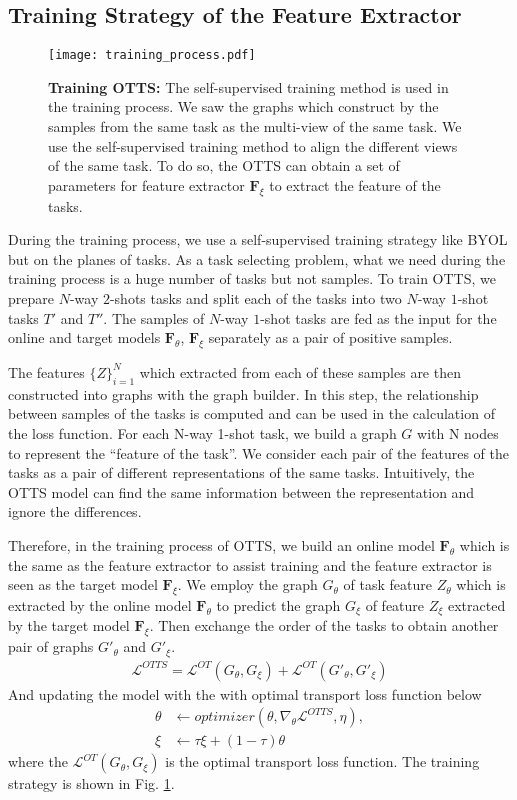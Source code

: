 \documentclass[10pt,journal,compsoc]{IEEEtran}
\begin{document}
\subsection{Training Strategy of the Feature Extractor}

\begin{figure*}[t]
    \centering
    \texttt{[image: training\_process.pdf]}
    \caption{\textbf{Training OTTS:} The self-supervised training method is used in the training process. We saw the graphs which construct by the samples from the same task as the multi-view of the same task. We use the self-supervised training method to align the different views of the same task. To do so, the OTTS can obtain a set of parameters for feature extractor $\mathbf{F}_\xi$ to extract the feature of the tasks.}
    \label{OTTS_training}
\end{figure*}

During the training process, we use a self-supervised training strategy like BYOL but on the planes of tasks. As a task selecting problem, what we need during the training process is a huge number of tasks but not samples. To train OTTS, we prepare $N$-way $2$-shots tasks and split each of the tasks into two $N$-way $1$-shot tasks $T'$ and $T''$. The samples of $N$-way $1$-shot tasks are fed as the input for the online and target models $\mathbf{F}_\theta$, $\mathbf{F}_\xi$ separately as a pair of positive samples. 

The features $\{Z\}_{i=1}^N$ which extracted from each of these samples are then constructed into graphs with the graph builder. In this step, the relationship between samples of the tasks is computed and can be used in the calculation of the loss function. For each N-way 1-shot task, we build a graph $G$ with N nodes to represent the “feature of the task”. We consider each pair of the features of the tasks as a pair of different representations of the same tasks. Intuitively, the OTTS model can find the same information between the representation and ignore the differences. 

Therefore, in the training process of OTTS, we build an online model $\mathbf{F}_\theta$ which is the same as the feature extractor to assist training and the feature extractor is seen as the target model $\mathbf{F}_\xi$. We employ the graph $G_\theta$ of task feature ${Z_\theta}$ which is extracted by the online model $\mathbf{F}_\theta$ to predict the graph $G_\xi$ of feature ${Z_\xi}$ extracted by the target model $\mathbf{F}_\xi$. Then exchange the order of the tasks to obtain another pair of graphs $G'_\theta$ and $G'_\xi$. 
\begin{align}
    \mathcal{L}^{OTTS} = \mathcal{L}^{OT}(G_\theta,G_\xi)+\mathcal{L}^{OT}(G'_\theta,G'_\xi)
\end{align}
And updating the model with the with optimal transport loss function below
\begin{align}
    \theta &\gets optimizer(\theta, \nabla_\theta \mathcal{L}^{OTTS}, \eta),\\
    \xi &\gets \tau\xi + (1-\tau)\theta
\end{align}
where the $\mathcal{L}^{OT}(G_\theta,G_\xi)$ is the optimal transport loss function. The training strategy is shown in Fig. \ref{OTTS_training}.
\end{document}
